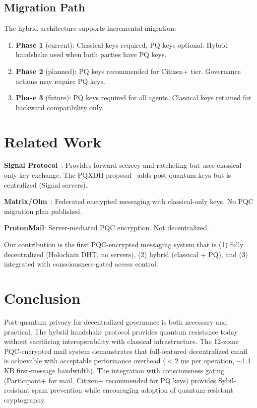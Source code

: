 \documentclass[11pt,twocolumn]{article}
\begin{document}
\subsection{Migration Path}

The hybrid architecture supports incremental migration:

\begin{enumerate}[nosep]
  \item \textbf{Phase 1} (current): Classical keys required, PQ keys optional.
    Hybrid handshake used when both parties have PQ keys.
  \item \textbf{Phase 2} (planned): PQ keys recommended for Citizen+ tier.
    Governance actions may require PQ keys.
  \item \textbf{Phase 3} (future): PQ keys required for all agents. Classical
    keys retained for backward compatibility only.
\end{enumerate}

\section{Related Work}

\textbf{Signal Protocol}~\cite{signal}: Provides forward secrecy and
ratcheting but uses classical-only key exchange. The PQXDH
proposal~\cite{signal_pqxdh} adds post-quantum keys but is centralized
(Signal servers).

\textbf{Matrix/Olm}~\cite{matrix}: Federated encrypted messaging with
classical-only keys. No PQC migration plan published.

\textbf{ProtonMail}: Server-mediated PQC encryption. Not decentralized.

Our contribution is the first PQC-encrypted messaging system that is
(1) fully decentralized (Holochain DHT, no servers), (2) hybrid
(classical + PQ), and (3) integrated with consciousness-gated access control.

\section{Conclusion}

Post-quantum privacy for decentralized governance is both necessary and
practical. The hybrid handshake protocol provides quantum resistance today
without sacrificing interoperability with classical infrastructure. The
12-zome PQC-encrypted mail system demonstrates that full-featured decentralized
email is achievable with acceptable performance overhead ($<2$ ms per operation,
$\sim$1.1 KB first-message bandwidth). The integration with consciousness
gating (Participant+ for mail, Citizen+ recommended for PQ keys) provides
Sybil-resistant spam prevention while encouraging adoption of quantum-resistant
cryptography.
\end{document}
